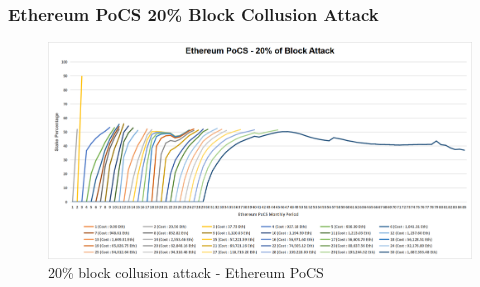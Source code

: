 \documentclass{article}
\begin{document}
\subsubsection{Ethereum PoCS 20\% Block Collusion Attack}

\begin{figure}[H]
    \centering
    \includegraphics[width=\textwidth]{./assets/20-of-block.png}
    \caption{20\% block collusion attack - Ethereum PoCS}
\end{figure}
\end{document}
